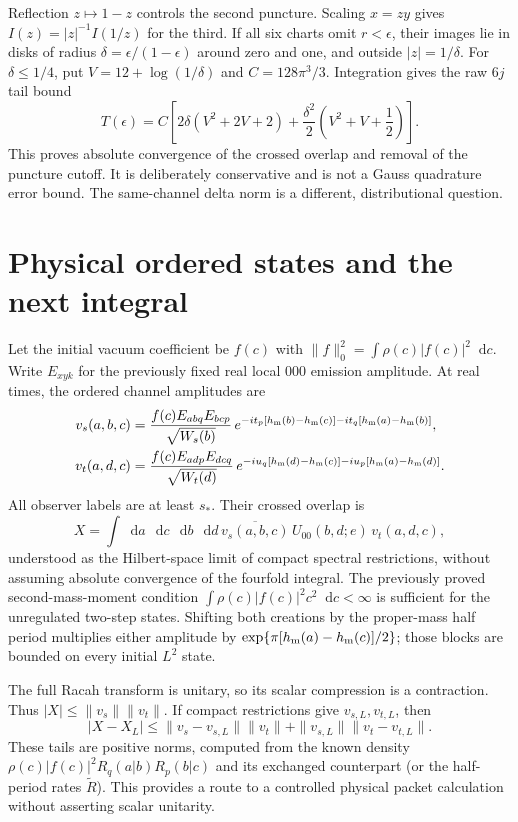 \documentclass[11pt,a4paper]{article}
\newcommand{\dd}{\mathop{}\!\mathrm d}
\begin{document}
Reflection $z\mapsto1-z$ controls the second puncture. Scaling $x=zy$
gives $I(z)=|z|^{-1}I(1/z)$ for the third. If all six charts omit
$r<\epsilon$, their images lie in disks of radius
$\delta=\epsilon/(1-\epsilon)$ around zero and one, and outside
$|z|=1/\delta$. For $\delta\le1/4$, put $V=12+\log(1/\delta)$
and $C=128\pi^3/3$. Integration gives the raw $6j$ tail bound
\begin{equation}
 T(\epsilon)=C\left[
  2\delta(V^2+2V+2)+
  \frac{\delta^2}{2}\left(V^2+V+\frac12\right)\right].
 \label{tail}
\end{equation}
This proves absolute convergence of the crossed overlap and removal of
the puncture cutoff. It is deliberately conservative and is not a
Gauss quadrature error bound. The same-channel delta norm is a different,
distributional question.

\section{Physical ordered states and the next integral}
Let the initial vacuum coefficient be $f(c)$ with
$\|f\|_0^2=\int\rho(c)|f(c)|^2\dd c$.
Write $E_{xyk}$ for the previously fixed real local $000$ emission
amplitude. At real times, the ordered channel amplitudes are
\begin{align}
 v_s(a,b,c)&=
 \frac{f(c)E_{abq}E_{bcp}}{\sqrt{W_s(b)}}\,
 e^{-it_p[h_{\rm m}(b)-h_{\rm m}(c)]
   -it_q[h_{\rm m}(a)-h_{\rm m}(b)]},\\
 v_t(a,d,c)&=
 \frac{f(c)E_{adp}E_{dcq}}{\sqrt{W_t(d)}}\,
 e^{-iu_q[h_{\rm m}(d)-h_{\rm m}(c)]
   -iu_p[h_{\rm m}(a)-h_{\rm m}(d)]}.
\end{align}
All observer labels are at least $s_*$. Their crossed overlap is
\begin{equation}
 X=\int\dd a\,\dd c\,\dd b\,\dd d\,
      \overline{v_s(a,b,c)}\,U_{00}(b,d;e)\,v_t(a,d,c),
 \label{X}
\end{equation}
understood as the Hilbert-space limit of compact spectral restrictions,
without assuming absolute convergence of the fourfold integral.
The previously proved second-mass-moment condition
$\int\rho(c)|f(c)|^2c^2\dd c<\infty$ is sufficient for the unregulated
two-step states. Shifting both creations by the proper-mass half period
multiplies either amplitude by
$\exp\{\pi[h_{\rm m}(a)-h_{\rm m}(c)]/2\}$; those blocks are bounded
on every initial $L^2$ state.

The full Racah transform is unitary, so its scalar compression is a
contraction. Thus $|X|\le\|v_s\|\|v_t\|$. If compact restrictions give
$v_{s,L},v_{t,L}$, then
\begin{equation}
 |X-X_L|\le
 \|v_s-v_{s,L}\|\|v_t\|+
 \|v_{s,L}\|\|v_t-v_{t,L}\|.
 \label{cutoff}
\end{equation}
These tails are positive norms, computed from the known density
$\rho(c)|f(c)|^2R_q(a|b)R_p(b|c)$ and its exchanged counterpart
(or the half-period rates $\widetilde R$).
This provides a route to a controlled physical packet calculation
without asserting scalar unitarity.
\end{document}
